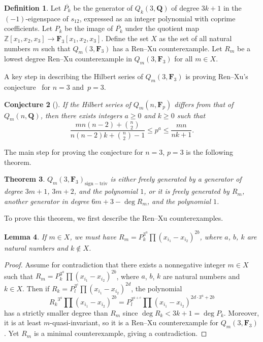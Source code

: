 \documentclass[pdftex]{sigma}
\newtheorem{Theorem}{Theorem}[section]
\newtheorem{Lemma}[Theorem]{Lemma}
\newtheorem{Conjecture}[Theorem]{Conjecture}
\theoremstyle{definition}
\newtheorem{Definition}[Theorem]{Definition}
\numberwithin{equation}{section}
\newcommand{\F}{\mathbf{F}}
\newcommand{\Z}{\mathbb{Z}}
\newcommand{\siv}{\mathrm{sign-triv}}
\begin{document}
\begin{Definition}
 Let $\overline{P_k}$ be the generator of $Q_k(3,\mathbf{Q})$ of degree $3k+1$ in the $(-1)$-eigenspace of $s_{12}$, expressed as an integer polynomial with coprime coefficients. Let $P_k$ be the image of $\overline{P_k}$ under the quotient map $\Z[x_1,x_2,x_3]\to\F_3[x_1,x_2,x_3]$. Define the set $X$ as the set of all natural numbers $m$ such that $Q_m(3,\mathbf{F}_3)$ has a Ren--Xu counterexample. Let $R_m$ be a lowest degree Ren--Xu counterexample in $Q_m(3,\mathbf{F}_3)$ for all $m\in X$.
\end{Definition}


A key step in describing the Hilbert series of $Q_m(3,\mathbf{F}_3)$ is proving Ren--Xu's conjecture~\cite{Ren_2020} for ${n=3}$ and~${p=3}$.

\begin{Conjecture}[\cite{Ren_2020}]\label{conj:ren}
 If the Hilbert series of $Q_m(n,\mathbf{F}_p)$ differs from that of $Q_m(n,\mathbf{Q})$, then there exists integers $a\geq 0$ and $k\geq 0$ such that
 \[\frac{mn(n-2)+\binom{n}{2}}{n(n-2)k+\binom{n}{2}-1}\leq p^a\leq \frac{mn}{nk+1}.\]
\end{Conjecture}

The main step for proving the conjecture for $n=3$, $p=3$ is the following theorem.

\begin{Theorem}\label{justRens}
 $Q_m(3,\mathbf{F}_3)_{\siv}$ is either freely generated by a generator of degree $3m+1$, $3m+2$, and the polynomial $1$, or it is freely generated by $R_m$, another generator in degree $6m+3-\deg R_m$, and the polynomial $1$.
\end{Theorem}

To prove this theorem, we first describe the Ren--Xu counterexamples.

\begin{Lemma}\label{nonExsOnly}
 If $m\in X$, we must have $R_m=P_k^{3^a}\prod (x_{i_1}-x_{i_2})^{2b}$, where $a$, $b$, $k$ are natural numbers and $k\not \in X$.
\end{Lemma}
\begin{proof}
 Assume for contradiction that there exists a nonnegative integer $m\in X$ such that $R_m=P_k^{3^a}\prod (x_{i_1}-x_{i_2})^{2b}$, where $a$, $b$, $k$ are natural numbers and $k\in X$. Then if $R_k=P_{l}^{3^c}\prod (x_{i_1}-x_{i_2})^{2d}$, the polynomial
 \[{R_k}^{3^a}\prod (x_{i_1}-x_{i_2})^{2b} = P_{l}^{3^{a+c}}\prod (x_{i_1}-x_{i_2})^{2d\cdot 3^a + 2b}\]
 has a strictly smaller degree than $R_m$ since $\deg R_k<3k+1=\deg P_k$. Moreover, it is at least $m$-quasi-invariant, so it is a Ren--Xu counterexample for $Q_m(3,\mathbf{F}_3)$. Yet $R_m$ is a minimal counterexample, giving a contradiction.
\end{proof}
\end{document}
